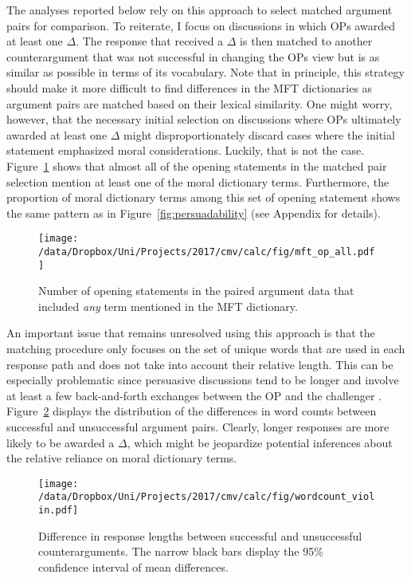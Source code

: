 The analyses reported below rely on this approach to select matched argument pairs for comparison. To reiterate, I focus on discussions in which OPs awarded at least one $\Delta$. The response that received a $\Delta$ is then matched to another counterargument that was not successful in changing  the OPs view but is as similar as possible in terms of its vocabulary. Note that in principle, this strategy should make it more difficult to find differences in the MFT dictionaries as argument pairs are matched based on their lexical similarity. One might worry, however, that the necessary initial selection on discussions where OPs ultimately awarded at least one $\Delta$ might disproportionately discard cases where the initial statement emphasized moral considerations. Luckily, that is not the case. Figure~\ref{fig:mft_op_all} shows that almost all of the opening statements in the matched pair selection mention at least one of the moral dictionary terms. Furthermore, the proportion of moral dictionary terms among this set of opening statement shows the same pattern as in Figure~\ref{fig:persuadability} (see Appendix for details).

\begin{figure}[ht]
\centering
\texttt{[image: /data/Dropbox/Uni/Projects/2017/cmv/calc/fig/mft\_op\_all.pdf]}
\caption[Number of opening statements in the paired argument data that included \textit{any} term mentioned in the MFT dictionary]{Number of opening statements in the paired argument data that included \textit{any} term mentioned in the MFT dictionary.}\label{fig:mft_op_all}
\end{figure}

An important issue that remains unresolved using this approach is that the matching procedure only focuses on the set of unique words that are used in each response path and does not take into account their relative length. This can be especially problematic since persuasive discussions tend to be longer and involve at least a few back-and-forth exchanges between the OP and the challenger \citep[c.f.,][616]{tan2016winning}. Figure~\ref{fig:wordcount_violin} displays the distribution of the differences in word counts between successful and unsuccessful argument pairs. Clearly, longer responses are more likely to be awarded a $\Delta$, which might be jeopardize potential inferences about the relative reliance on moral dictionary terms.

\begin{figure}[ht]
\centering
\texttt{[image: /data/Dropbox/Uni/Projects/2017/cmv/calc/fig/wordcount\_violin.pdf]}
\caption[Difference in response lengths between successful and unsuccessful counterarguments]{Difference in response lengths between successful and unsuccessful counterarguments. The narrow black bars display the 95\% confidence interval of mean differences.}\label{fig:wordcount_violin}
\end{figure}


